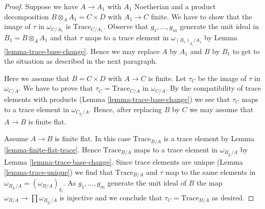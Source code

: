 \documentclass[10pt,a4paper]{amsart}
\theoremstyle{plain}
\theoremstyle{definition}
\theoremstyle{remark}
\numberwithin{equation}{subsection}
\begin{document}
\begin{proof}
Suppose we have $A \to A_1$ with $A_1$ Noetherian and a product
decomposition $B \otimes_A A_1 = C \times D$ with $A_1 \to C$ finite.
We have to show that the image of $\tau$ in $\omega_{C/A_1}$ is
$\text{Trace}_{C/A_1}$. Observe that $g_1, \ldots, g_m$
generate the unit ideal in $B_1 = B \otimes_A A_1$ and that
$\tau$ maps to a trace element in $\omega_{(B_1)_{g_i}/A_1}$
by Lemma \ref{lemma-trace-base-change}. Hence we may replace
$A$ by $A_1$ and $B$ by $B_1$ to get to the situation as described
in the next paragraph.

\medskip\noindent
Here we assume that $B = C \times D$ with $A \to C$ is finite.
Let $\tau_C$ be the image of $\tau$ in $\omega_{C/A}$.
We have to prove that $\tau_C = \text{Trace}_{C/A}$ in $\omega_{C/A}$.
By the compatibility of trace elements with products
(Lemma \ref{lemma-trace-base-change})
we see that $\tau_C$ maps to a trace element in $\omega_{C_{g_i}/A}$.
Hence, after replacing $B$ by $C$ we may assume that $A \to B$
is finite flat.

\medskip\noindent
Assume $A \to B$ is finite flat. In this case $\text{Trace}_{B/A}$
is a trace element by Lemma \ref{lemma-finite-flat-trace}.
Hence $\text{Trace}_{B/A}$ maps to a trace element in
$\omega_{B_{g_i}/A}$ by Lemma \ref{lemma-trace-base-change}.
Since trace elements are unique (Lemma \ref{lemma-trace-unique})
we find that $\text{Trace}_{B/A}$ and $\tau$ map
to the same elements in $\omega_{B_{g_i}/A} = (\omega_{B/A})_{g_i}$.
As $g_1, \ldots, g_m$ generate the unit ideal of $B$ the map
$\omega_{B/A} \to \prod \omega_{B_{g_i}/A}$ is injective
and we conclude that $\tau_C = \text{Trace}_{B/A}$ as desired.
\end{proof}
\end{document}
